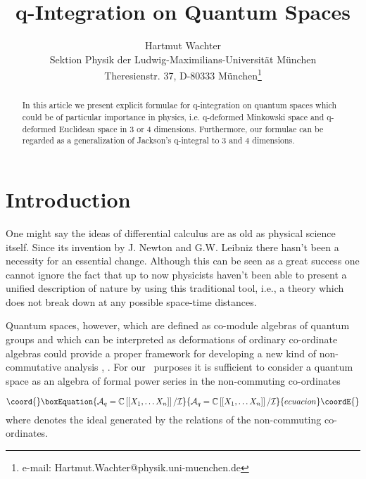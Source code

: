 \documentclass[a4paper,11pt,oneside]{article}
\begin{document}
\author{Hartmut Wachter \\
Sektion Physik der Ludwig-Maximilians-Universit\"{a}t M\"{u}nchen\\
Theresienstr. 37, D-80333 M\"{u}nchen\thanks{%
e-mail: Hartmut.Wachter@physik.uni-muenchen.de}}
\title{q-Integration on Quantum Spaces}
\maketitle

\begin{abstract}
In this article we present explicit formulae for q-integration on quantum
spaces which could be of particular importance in physics, i.e. q-deformed
Minkowski space and q-deformed Euclidean space in 3 or 4 dimensions.
Furthermore, our formulae can be regarded as a generalization of Jackson's
q-integral to 3 and 4 dimensions.
\end{abstract}

\section{Introduction}

One might say the ideas of differential calculus are as old as physical
science itself. Since its invention by J. Newton and G.W. Leibniz there
hasn't been a necessity for an essential change. Although this can be seen
as a great success one cannot ignore the fact that up to now physicists
haven't been able to present a unified description of nature by using this
traditional tool, i.e., a theory which does not break down at any possible
space-time distances.

Quantum spaces, however, which are defined as co-module algebras of quantum
groups and which can be interpreted as deformations of ordinary co-ordinate
algebras \cite{RTF90} could provide a proper framework for developing a new
kind of non-commutative analysis \cite{Wes00}, \cite{Maj93}. For our \
purposes it is sufficient to consider a quantum space as an algebra \myHighlight{$%
\mathcal{A}_{q}$}\coordHE{} of formal power series in the non-commuting co-ordinates \myHighlight{$%
X_{1},X_{2},\ldots ,X_{n}$}\coordHE{}

\begin{equation}\coord{}\boxEquation{
\mathcal{A}_{q}=\mathbb{C}\left[ \left[ X_{1},\ldots X_{n}\right] \right] /
\mathcal{I}
}{
\mathcal{A}_{q}=\mathbb{C}\left[ \left[ X_{1},\ldots X_{n}\right] \right] /
\mathcal{I}
}{ecuacion}\coordE{}\end{equation}
where \coordHE{} denotes the ideal generated by the relations of the
non-commuting co-ordinates.
\end{document}
